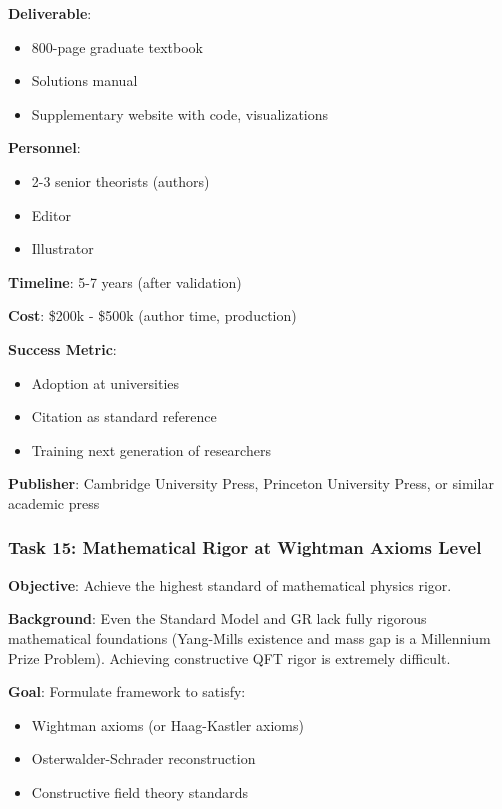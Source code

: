 \textbf{Deliverable}:
\begin{itemize}
    \item 800-page graduate textbook
    \item Solutions manual
    \item Supplementary website with code, visualizations
\end{itemize}

\textbf{Personnel}:
\begin{itemize}
    \item 2-3 senior theorists (authors)
    \item Editor
    \item Illustrator
\end{itemize}

\textbf{Timeline}: 5-7 years (after validation)

\textbf{Cost}: \$200k - \$500k (author time, production)

\textbf{Success Metric}:
\begin{itemize}
    \item Adoption at universities
    \item Citation as standard reference
    \item Training next generation of researchers
\end{itemize}

\textbf{Publisher}: Cambridge University Press, Princeton University Press, or similar academic press

\subsubsection{Task 15: Mathematical Rigor at Wightman Axioms Level}

\textbf{Objective}: Achieve the highest standard of mathematical physics rigor.

\textbf{Background}:
Even the Standard Model and GR lack fully rigorous mathematical foundations (Yang-Mills existence and mass gap is a Millennium Prize Problem). Achieving constructive QFT rigor is extremely difficult.

\textbf{Goal}:
Formulate framework to satisfy:
\begin{itemize}
    \item Wightman axioms (or Haag-Kastler axioms)
    \item Osterwalder-Schrader reconstruction
    \item Constructive field theory standards
\end{itemize}

